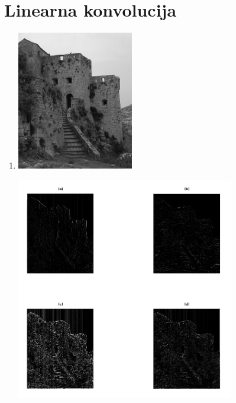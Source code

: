 \documentclass[12pt, a4]{report}
\begin{document}
        \section{Linearna konvolucija}
            \begin{enumerate}
                \item
                    \begin{minipage}{\linewidth}
                        \centering
                        \includegraphics[width=0.4\textwidth]{klis2}
                    \end{minipage}
                    \begin{minipage}{\linewidth}
                        \centering
                        \includegraphics[width=0.75\textwidth]{conv2d}
                    \end{minipage}\\

\end{enumerate}
\end{document}

